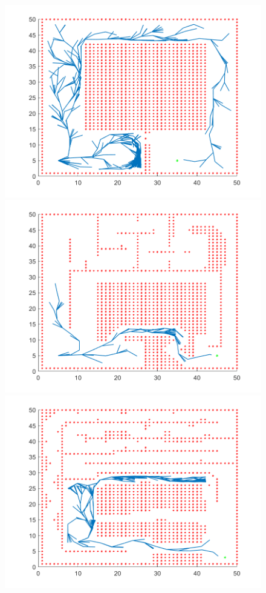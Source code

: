 \documentclass[a4paper, 11pt]{article}
\begin{document}
\begin{figure}[h]
	\centering
	\includegraphics[scale=0.52]{../Figures/map1a.png}
	\includegraphics[scale=0.52]{../Figures/map2.png}
	\includegraphics[scale=0.52]{../Figures/map3.png}

\end{figure}
\end{document}

